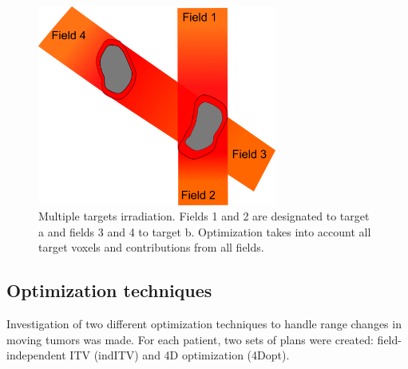 \documentclass[type=dr, dr=rernat, accentcolor=tud7b,colorbacktitle, bigchapter, openright, twoside, 12pt ]{tudthesis}
\begin{document}
\begin{figure}[H]
	\begin{center}
		\includegraphics[width=0.7\textwidth]{./Images/multiTarget.png}
		\caption{Multiple targets irradiation. Fields 1 and 2 are designated to target a and fields 3 and 4 to target b. Optimization takes into account all target voxels and contributions from all fields.}
		\label{Fig:multiTargets}
	\end{center}
\end{figure}



\subsection{Optimization techniques}

Investigation of two different optimization techniques to handle range changes in moving tumors was made. For each patient, two sets of plans were created: field-independent ITV (indITV) and 4D optimization (4Dopt). 
\end{document}
